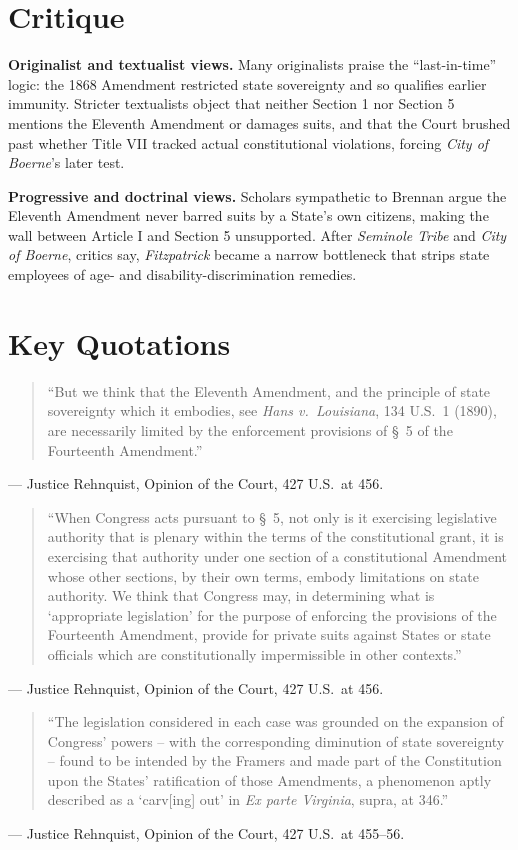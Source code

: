 \documentclass[12pt]{article}
\begin{document}
\section{Critique}

\textbf{Originalist and textualist views.} Many originalists praise the ``last-in-time'' logic: the 1868 Amendment restricted state sovereignty and so qualifies earlier immunity. Stricter textualists object that neither Section 1 nor Section 5 mentions the Eleventh Amendment or damages suits, and that the Court brushed past whether Title VII tracked actual constitutional violations, forcing \textit{City of Boerne}'s later test.

\textbf{Progressive and doctrinal views.} Scholars sympathetic to Brennan argue the Eleventh Amendment never barred suits by a State's own citizens, making the wall between Article I and Section 5 unsupported. After \textit{Seminole Tribe} and \textit{City of Boerne}, critics say, \textit{Fitzpatrick} became a narrow bottleneck that strips state employees of age- and disability-discrimination remedies.

\section{Key Quotations}

\begin{quote}\sloppy
``But we think that the Eleventh Amendment, and the principle of state sovereignty which it embodies, see \textit{Hans v.\ Louisiana}, 134 U.S.\ 1 (1890), are necessarily limited by the enforcement provisions of \S~5 of the Fourteenth Amendment.''
\end{quote}
\noindent --- Justice Rehnquist, Opinion of the Court, 427 U.S.\ at 456.

\begin{quote}\sloppy
``When Congress acts pursuant to \S~5, not only is it exercising legislative authority that is plenary within the terms of the constitutional grant, it is exercising that authority under one section of a constitutional Amendment whose other sections, by their own terms, embody limitations on state authority. We think that Congress may, in determining what is `appropriate legislation' for the purpose of enforcing the provisions of the Fourteenth Amendment, provide for private suits against States or state officials which are constitutionally impermissible in other contexts.''
\end{quote}
\noindent --- Justice Rehnquist, Opinion of the Court, 427 U.S.\ at 456.

\begin{quote}\sloppy
``The legislation considered in each case was grounded on the expansion of Congress' powers -- with the corresponding diminution of state sovereignty -- found to be intended by the Framers and made part of the Constitution upon the States' ratification of those Amendments, a phenomenon aptly described as a `carv[ing] out' in \textit{Ex parte Virginia}, supra, at 346.''
\end{quote}
\noindent --- Justice Rehnquist, Opinion of the Court, 427 U.S.\ at 455--56.
\end{document}
